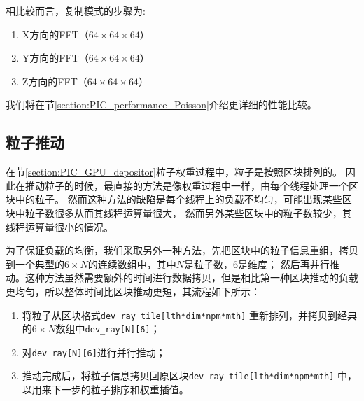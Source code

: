 相比较而言，复制模式的步骤为:
\begin{enumerate}
  \item X方向的FFT（$64 \times 64 \times 64$）
  \item Y方向的FFT（$64 \times 64 \times 64$）
  \item Z方向的FFT（$64 \times 64 \times 64$）
\end{enumerate}

我们将在节\eqref{section:PIC_performance_Poisson}介绍更详细的性能比较。

\subsection{粒子推动}
在节\eqref{section:PIC_GPU_depositor}粒子权重过程中，粒子是按照区块排列的。
因此在推动粒子的时候，最直接的方法是像权重过程中一样，由每个线程处理一个区块中的粒子。
然而这种方法的缺陷是每个线程上的负载不均匀，可能出现某些区块中粒子数很多从而其线程运算量很大，
然而另外某些区块中的粒子数较少，其线程运算量很小的情况。

为了保证负载的均衡，我们采取另外一种方法，先把区块中的粒子信息重组，拷贝到一个典型的$6 \times N$的连续数组中，其中$N$是粒子数，6是维度；
然后再并行推动。这种方法虽然需要额外的时间进行数据拷贝，但是相比第一种区块推动的负载更均匀，所以整体时间比区块推动更短，其流程如下所示：
\begin{enumerate}
  \item 将粒子从区块格式\verb"dev_ray_tile[lth*dim*npm*mth]" 重新排列，并拷贝到经典的$6 \times N$数组中\verb"dev_ray[N][6]"；
  \item 对\verb"dev_ray[N][6]"进行并行推动；
  \item 推动完成后，将粒子信息拷贝回原区块\verb"dev_ray_tile[lth*dim*npm*mth]" 中，以用来下一步的粒子排序和权重插值。
\end{enumerate}



